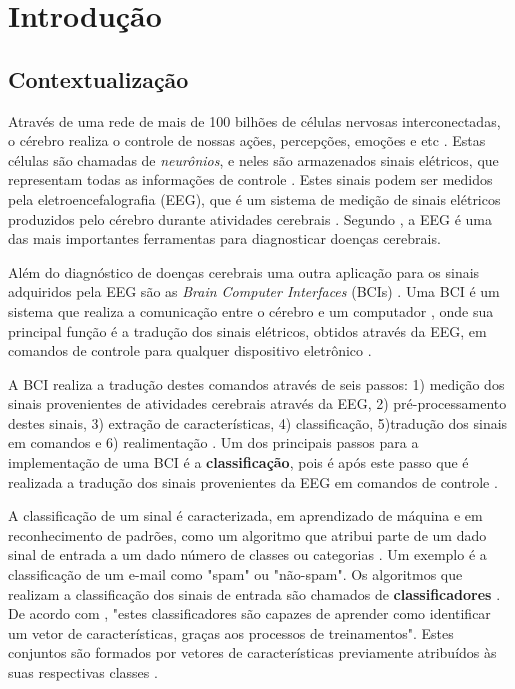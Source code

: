\chapter[Introdução]{Introdução}


\section{Contextualização}

Através de uma rede de mais de 100 bilhões de células nervosas interconectadas, o cérebro
realiza o controle de nossas ações, percepções, emoções e etc \cite{KANDEL}. Estas células
são chamadas de \textit{neurônios}, e neles são armazenados sinais elétricos, que representam
todas as informações de controle \cite{Siulybook}. Estes sinais podem ser medidos pela
eletroencefalografia (EEG), que é um sistema de medição de sinais elétricos produzidos pelo
cérebro durante atividades cerebrais \cite{F.Lotte}. Segundo \cite{SIULYDissertacao}, a EEG
é uma das mais importantes ferramentas para diagnosticar doenças cerebrais.

Além do diagnóstico de doenças cerebrais uma outra aplicação para os sinais adquiridos
pela EEG são as \textit{Brain Computer Interfaces} (BCIs) \cite{F.Lotte}. Uma BCI é um
sistema que realiza a comunicação entre o cérebro e um computador \cite{Siulybook}, onde
sua principal função é a tradução dos sinais elétricos, obtidos através da EEG, em comandos
de controle para qualquer dispositivo eletrônico \cite{Siulybook}.

A BCI realiza a tradução destes comandos através de seis passos: 1) medição dos sinais
provenientes de atividades cerebrais através da EEG, 2) pré-processamento destes sinais,
3) extração de características, 4) classificação, 5)tradução dos sinais em comandos e 6)
realimentação \cite{MasonAndBirch}. Um dos principais passos para a implementação de uma
BCI é a \textbf{classificação}, pois é após este passo que é realizada a tradução dos sinais provenientes da EEG
em comandos de controle \cite{MasonAndBirch}.

A classificação de um sinal é caracterizada, em aprendizado de máquina e em reconhecimento de
padrões, como um algoritmo que atribui parte de um dado sinal de entrada a um dado número de
classes ou categorias \cite{brunelli2009template}. Um exemplo é a classificação de um e-mail
como "spam" ou "não-spam". Os algoritmos que realizam a classificação dos sinais de entrada são
chamados de \textbf{classificadores} \cite{Siulybook}. De acordo com \cite[p. 41]{lottephd}, "estes
classificadores são capazes de aprender como identificar um vetor de características, graças
aos processos de treinamentos". Estes conjuntos são formados por vetores de características
previamente atribuídos às suas respectivas classes \cite{lottephd}.

